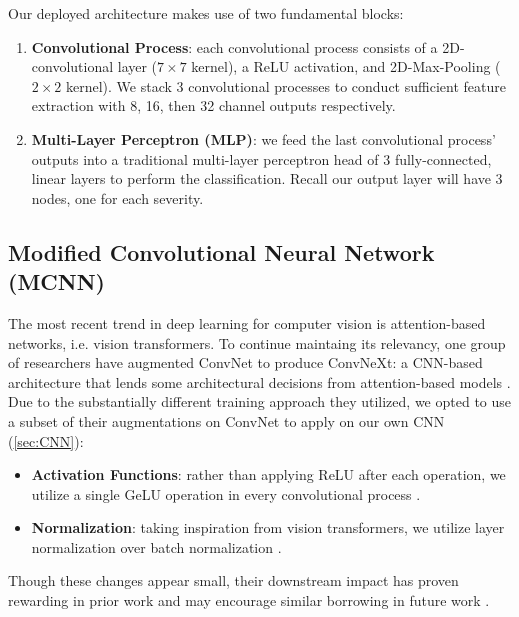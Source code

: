 \documentclass[conference]{IEEEtran}
\begin{document}
Our deployed architecture makes use of two fundamental blocks:
\begin{enumerate}
    \item \textbf{Convolutional Process}: each convolutional process
    consists of a 2D-convolutional layer ($7 \times 7$ kernel), a ReLU activation, and 2D-Max-Pooling ($2 \times 2$ kernel). We stack 3 convolutional processes to conduct sufficient feature extraction with 8, 16, then 32 channel outputs respectively.
    
    \item \textbf{Multi-Layer Perceptron (MLP)}: we feed the last convolutional process' outputs into a traditional multi-layer perceptron head of 3 fully-connected, linear layers to perform the classification. Recall our output layer will have 3 nodes, one for each severity.
\end{enumerate}

\subsection{Modified Convolutional Neural Network (MCNN)}
The most recent trend in deep learning for computer vision is attention-based networks, i.e. vision transformers. To continue maintaing its relevancy, one group of researchers have augmented ConvNet to produce ConvNeXt: a CNN-based architecture that lends some architectural decisions from attention-based models \cite{convnet}. Due to the substantially different training approach they utilized, we opted to use a subset of their augmentations on ConvNet to apply on our own CNN (\ref{sec:CNN}):
\begin{itemize}
    \item \textbf{Activation Functions}: rather than applying ReLU after each operation, we utilize a single GeLU operation in every convolutional process \cite{convnet}.
    
    \item \textbf{Normalization}: taking inspiration from vision transformers, we utilize layer normalization over batch normalization \cite{convnet}.
\end{itemize}

Though these changes appear small, their downstream impact has proven rewarding in prior work and may encourage similar borrowing in future work \cite{convnet}.
\end{document}
